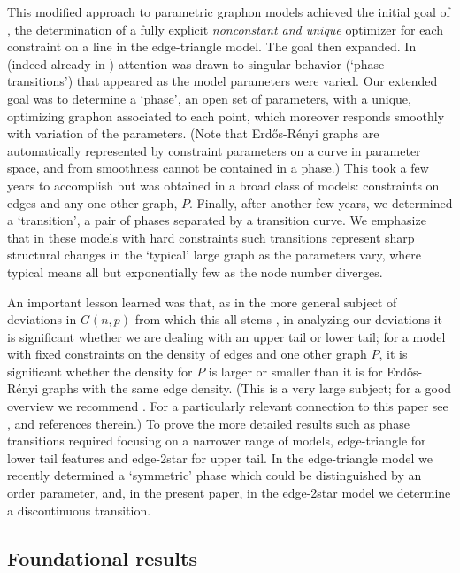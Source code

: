 \documentclass[12pt]{amsart}
\newcommand{\1}{\mathbf{1}}
\begin{document}
This modified approach to parametric graphon models achieved the
initial goal of \cite{RS1,RS2}, the determination of a fully explicit
{\em nonconstant and unique} optimizer for each constraint on a line
in the edge-triangle model. The goal then expanded.  In \cite{CD}
(indeed already in \cite{CV}) attention was drawn to singular behavior
(`phase transitions') that appeared as the model parameters were
varied. Our extended goal was to determine a `phase', an open set of
parameters, with a unique, optimizing graphon associated to each
point, which moreover responds smoothly with variation of the
parameters. (Note that Erd\H{o}s-R\'enyi graphs are automatically
represented by constraint parameters on a curve in parameter space,
and from smoothness cannot be contained in a phase.) This took a few years to
accomplish but was obtained \cite{KRRS2} in a broad class of models:
constraints on edges and any one other graph, $P$. Finally, after
another few years, we determined \cite{NRS3} a `transition', a pair of
 phases separated by a transition curve. We emphasize that
in these models with hard constraints such transitions represent sharp
structural changes in the `typical' large graph as the parameters
vary, where typical means all but exponentially few as the node number
diverges.

An important lesson learned was that, as in the more general subject
of deviations in $G(n,p)$ from which this all stems \cite{CV}, in
analyzing our deviations it is significant whether we are dealing with
an upper tail or lower tail; for a model with fixed constraints on the
density of edges and one other graph $P$, it is significant whether
the density for $P$ is larger or smaller than it is for
Erd\H{o}s-R\'enyi graphs with the same edge density. (This is a very
large subject; for a good overview we recommend \cite{Ch}.
For a particularly relevant connection to this paper
see \cite{NRS2}, and references therein.) To prove the more detailed
results such as phase transitions required focusing on a narrower
range of models, edge-triangle for lower tail features and edge-2star
for upper tail. In the edge-triangle model we recently determined
\cite{NRS4} a `symmetric' phase which could be distinguished by an
order parameter, and, in the present paper, in the edge-2star model we
determine a discontinuous transition.


\subsection{Foundational results}
\end{document}
